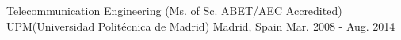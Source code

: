 

\begin{cventries}

  \cventry
    {Telecommunication Engineering (Ms. of Sc. ABET/AEC Accredited)} %
    {UPM(Universidad Politécnica de Madrid)} %
    {Madrid, Spain} %
    {Mar. 2008 - Aug. 2014} %
    {
    }

\end{cventries}
